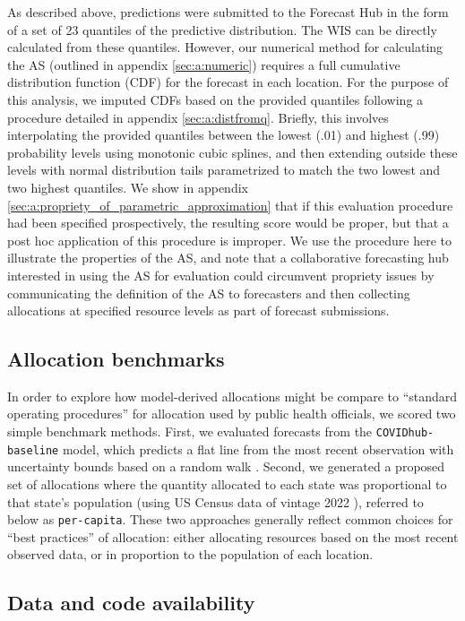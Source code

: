 \documentclass{article}
\begin{document}
As described above, predictions were submitted to the Forecast Hub in the form of a set of 23 quantiles of the
predictive distribution. The WIS can be directly calculated from these quantiles. However, our numerical method for calculating 
the AS (outlined in appendix \ref{sec:a:numeric})
requires a full cumulative distribution function (CDF) for the forecast in each location.
For the purpose of this analysis, we imputed CDFs based on the provided quantiles following a procedure detailed in 
appendix \ref{sec:a:distfromq}. Briefly, this involves interpolating the provided quantiles between the lowest (.01) and highest 
(.99) probability levels using monotonic cubic splines, and then extending outside these levels with normal distribution tails
parametrized to match the two lowest and two highest quantiles. We show in appendix \ref{sec:a:propriety_of_parametric_approximation}
that if this evaluation procedure
had been specified prospectively, the resulting score would be proper, but that a post hoc application of this
procedure is improper. We use the procedure here to illustrate the properties of the AS, and note that a collaborative
forecasting hub interested in using the AS for evaluation could circumvent propriety issues by communicating the
definition of the AS to forecasters and then collecting allocations at specified resource levels as part of forecast
submissions.

\subsection{Allocation benchmarks}

In order to explore how model-derived allocations might be compare to ``standard operating procedures'' for allocation
used by public health officials, we scored two simple benchmark methods. First, we evaluated forecasts from the
\texttt{COVIDhub-baseline} model, which predicts a flat line from the most recent observation with uncertainty bounds
based on a random walk \citep{cramer_evaluation_2022}. Second, we generated a proposed set of allocations where the
quantity allocated to each state was proportional to that state's population (using US Census data of vintage 2022
\citep{us_census_nst_est2022}), referred to below as \texttt{per-capita}. These two approaches generally reflect common
choices for ``best practices'' of allocation: either allocating resources based on the most recent observed data, or in
proportion to the population of each location. 

\subsection{Data and code availability}
\end{document}
